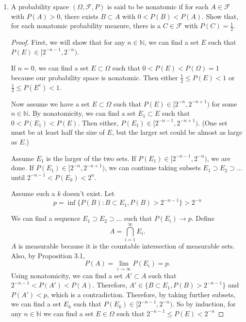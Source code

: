 \documentclass[a4paper]{article}
\newcommand{\N}{\mathbb{N}}
\begin{document}
\begin{enumerate}
\begin{proof}
    \end{proof}

  \item
    A probability space $ ( \Omega, \mathcal{F}, P )$ is said to be nonatomic if for each $A \in \mathcal{F}$ with $P(A) > 0$, there exists $B \subset A$ with $0 < P(B) < P(A)$. Show that, for each nonatomic probability measure, there is a $C \in \mathcal{F}$ with $P(C) = \frac{1}{2}$.

    \begin{proof}

      First, we will show that for any $n \in \N$, we can find a set $E$ such that $P(E) \in [2^{-n-1}, 2^{-n})$.

      If $n=0$, we can find a set $E \subset \Omega$ such that $0 < P(E) < P(\Omega) = 1$ because our probability space is nonatomic. Then either $\frac{1}{2} \leq P(E) < 1$ or
      $\frac{1}{2} \leq P(E^c) < 1$.

      Now assume we have a set $E \subset \Omega$ such that $P(E) \in [2^{-n}, 2^{-n+1})$ for some $n \in \N$. By nonatomicity, we can find a set
      $E_1 \subset E$ such that $0 < P(E_1) < P(E)$. Then either, $P(E_1) \in [2^{-n-1}, 2^{-n+1})$. (One set must be at least half the size of
      $E$, but the larger set could be almost as large as $E$.)

      Assume $E_1$ is the larger of the two sets. If $P(E_1) \in [2^{-n-1}, 2^{-n})$, we are done.
        If $P(E_1) \in [2^{-n}, 2^{-n+1})$, we can continue
        taking subsets ${E_1 \supset E_2 \supset \dots}$ until $2^{-n-1} < P(E_k) < 2^{n}$.

        Assume such a $k$ doesn't exist. Let
        \[ p = \inf \{ P(B) : B \subset E_1, P(B) > 2^{-n-1} \} > 2^{-n} \]

        We can find a sequence $E_1 \supset E_2 \supset \dots$ such that $P(E_i) \to p$. Define
        \[ A = \bigcap_{i=1}^\infty E_i .\]
        $A$ is measurable because it is the countable intersection of measurable sets. Also, by Proposition 3.1,
        \[ P(A) = \lim_{i \to \infty} P(E_i) = p .\]
        Using nonatomicity, we can find a set $A' \subset A$ such that $2^{-n-1} < P(A') < P(A)$. Therefore, $A' \in \{ B \subset E_1, P(B) > 2^{-n-1}
      \}$ and $P(A') < p$, which is a contradiction. Therefore, by taking further subsets, we can find a set $E_k$ such that $P(E_k) \in [2^{-n-1},
        2^{-n})$. So by induction, for any $n \in \N$ we can find a set $E \in \Omega$ such that $2^{-n-1} \leq P(E) < 2^{-n}$


\end{proof}
\end{enumerate}
\end{document}
